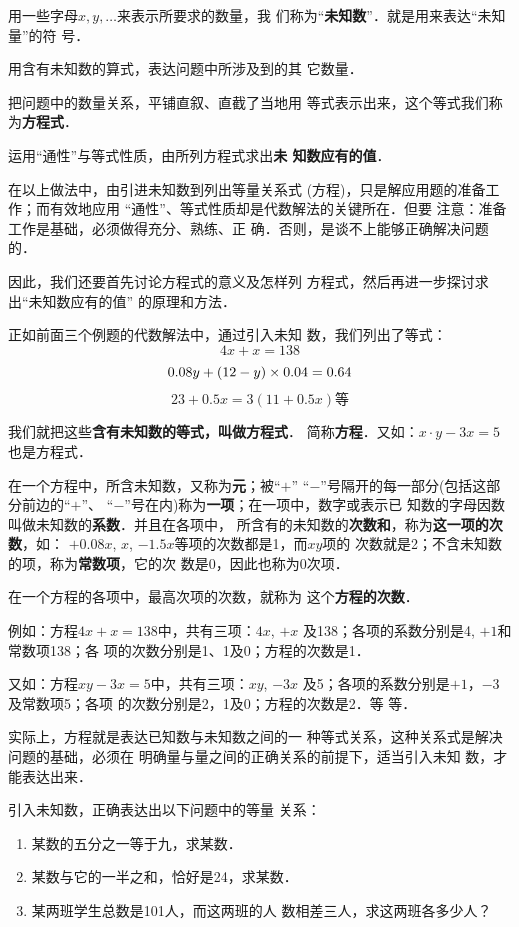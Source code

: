     用一些字母$x,  y,\ldots$来表示所要求的数量，我
们称为“\textbf{未知数}”．就是用来表达“未知量”的符
号．

    用含有未知数的算式，表达问题中所涉及到的其
它数量．

    把问题中的数量关系，平铺直叙、直截了当地用
等式表示出来，这个等式我们称为\textbf{方程式}．

    运用“通性”与等式性质，由所列方程式求出\textbf{未
知数应有的值}．

    在以上做法中，由引进未知数到列出等量关系式
  (方程)，只是解应用题的准备工作；而有效地应用
  “通性”、等式性质却是代数解法的关键所在．但要
注意：准备工作是基础，必须做得充分、熟练、正
确．否则，是谈不上能够正确解决问题的．

    因此，我们还要首先讨论方程式的意义及怎样列
方程式，然后再进一步探讨求出“未知数应有的值”
的原理和方法．

    正如前面三个例题的代数解法中，通过引入未知
数，我们列出了等式：
\[4x+x=138\]
\[0.08y+(12-y)\times 0.04=0.64\]
\[23+0.5x=3(11+0.5x)\text{等}\]

我们就把这些\textbf{含有未知数的等式，叫做方程式}．
简称\textbf{方程}．又如：$x\cdot y-3x=5$也是方程式．

在一个方程中，所含未知数，又称为\textbf{元}；被“$+$”
“$-$”号隔开的每一部分(包括这部分前边的“$+$”、
“$-$”号在内)称为\textbf{一项}；在一项中，数字或表示已
知数的字母因数叫做未知数的\textbf{系数}．并且在各项中，
所含有的未知数的\textbf{次数和}，称为\textbf{这一项的次数}，如：
$+ 0. 08x$,  $x$, $-1.5x$等项的次数都是1，而$xy$项的
次数就是2；不含未知数的项，称为\textbf{常数项}，它的次
数是0，因此也称为0次项．

  在一个方程的各项中，最高次项的次数，就称为
这个\textbf{方程的次数}．

  例如：方程$4x+x=138$中，共有三项：$4 x$, $+x$
及138；各项的系数分别是4, $+1$和常数项138；各
项的次数分别是1、1及0；方程的次数是1．

  又如：方程$xy-3x=5$中，共有三项：$xy$, $-3x$
及5；各项的系数分别是$+1$，$-3$及常数项5；各项
的次数分别是2，1及0；方程的次数是2．等
等．

  实际上，方程就是表达已知数与未知数之间的一
种等式关系，这种关系式是解决问题的基础，必须在
明确量与量之间的正确关系的前提下，适当引入未知
数，才能表达出来．

\begin{example}
引入未知数，正确表达出以下问题中的等量
关系：
\begin{enumerate}
    \item 某数的五分之一等于九，求某数．
    \item 某数与它的一半之和，恰好是24，求某数．
    \item 某两班学生总数是101人，而这两班的人
    数相差三人，求这两班各多少人？
\end{enumerate}
\end{example}

